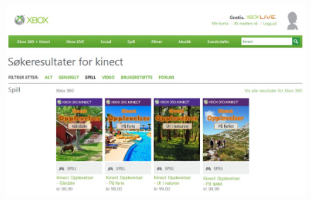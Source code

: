\begin{figure} [H]
\centering
\includegraphics[scale=0.5, angle=90]{SpillXboxNYNY.jpg}
\label{fig:videogameseriesHeleNorsk}
\end{figure}